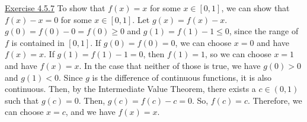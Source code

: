 \documentclass{exam}
\begin{document}

\underline{Exercise 4.5.7}
\newline
\newline
To show that $f(x)=x$ for some $x\in[0,1]$, we can show that $f(x)-x=0$ for some $x\in[0,1]$. Let $g(x)=f(x)-x$. $g(0)=f(0)-0=f(0)\ge0$ and $g(1)=f(1)-1\le0$, since the range of $f$ is contained in $[0,1]$. If $g(0)=f(0)=0$, we can choose $x=0$ and have $f(x)=x$. If $g(1)=f(1)-1=0$, then $f(1)=1$, so we can choose $x=1$ and have $f(x)=x$. In the case that neither of those is true, we have $g(0)>0$ and $g(1)<0$. Since $g$ is the difference of continuous functions, it is also continuous. Then, by the Intermediate Value Theorem, there exists a $c\in(0,1)$ such that $g(c)=0$. Then, $g(c)=f(c)-c=0$. So, $f(c)=c$. Therefore, we can choose $x=c$, and we have $f(x)=x$.
\newline
\end{document}
